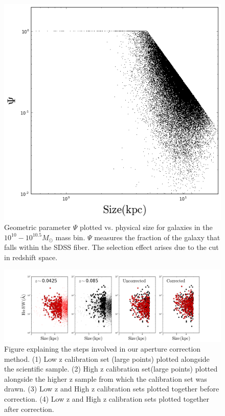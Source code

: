 \documentclass[iop]{emulateapj}
\begin{document}
\begin{figure}
	\centering
	\includegraphics[width=1 \columnwidth]{geometry_10_0.png}
	\caption{Geometric parameter $\Psi$ plotted vs. physical size for galaxies in the $10^{10} - 10^{10.5} M_{\odot}$ mass bin. $\Psi$ measures the fraction of the galaxy that falls within the SDSS fiber. The selection effect arises due to the cut in redshift space.}
     \label{fig:geo}

\end{figure}

\begin{figure}
	\centering
	\includegraphics[width=2 \columnwidth]{steps_10_0.png}
	\caption{Figure explaining the steps involved in our aperture correction method. (1) Low z calibration set (large points) plotted alongside the scientific sample. (2) High z calibration set(large points) plotted alongside the higher z sample from which the calibration set was drawn. (3) Low z and High z calibration sets plotted together before correction. (4) Low z and High z calibration sets plotted together after correction.}
     \label{fig:steps}

\end{figure}
\end{document}
